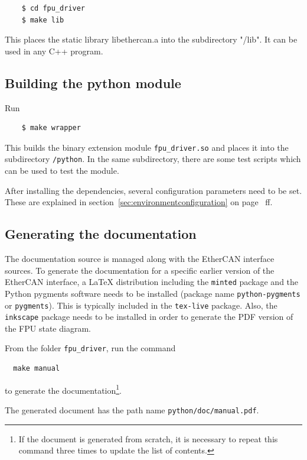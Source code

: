 \documentclass[fontsize=12,a4paper]{scrreprt}
\begin{document}
  \begin{verbatim}
    $ cd fpu_driver
    $ make lib
  \end{verbatim}

This places the static library libethercan.a into the subdirectory
"/lib". It can be used in any C++ program.

\subsection{Building the python module}

Run

  \begin{verbatim}
    $ make wrapper
  \end{verbatim}

This builds the binary extension module \verb+fpu_driver.so+
and places it into the subdirectory \verb+/python+.
In the same subdirectory, there are some test
scripts which can be used to test the module.

After installing the dependencies, several configuration parameters
need to be set. These are explained in
section~\ref{sec:environmentconfiguration} on
page~\pageref{sec:environmentconfiguration} ff.

\subsection{Generating the documentation}

The documentation source is managed along with the EtherCAN interface sources.  To
generate the documentation for a specific earlier version of the
EtherCAN interface, a \LaTeX{} distribution including the \texttt{minted} package
and the Python pygments software needs to be installed (package name
\texttt{python-pygments} or \texttt{pygments}).  This is typically
included in the \texttt{tex-live} package. Also, the \texttt{inkscape}
package needs to be installed in order to generate the PDF version of
the FPU state diagram.

From the folder \texttt{fpu\_driver}, run the
command
\begin{verbatim}
  make manual
\end{verbatim}
to generate the documentation\footnote{If the document is generated
  from scratch, it is necessary to repeat this command three times to
  update the list of contents.}.

The generated document has the path name
\texttt{python/doc/manual.pdf}.
\end{document}
